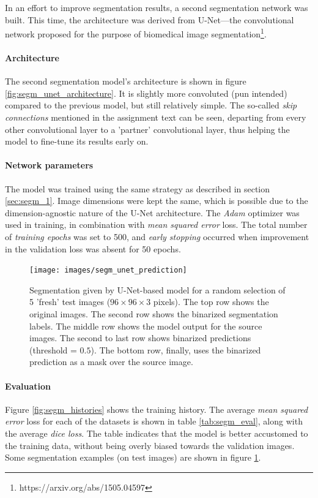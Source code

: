 In an effort to improve segmentation results, a second segmentation network was built. This time, the architecture was derived from U-Net---the convolutional network proposed for the purpose of biomedical image segmentation\footnote{https://arxiv.org/abs/1505.04597}.

\paragraph{Architecture} 
The second segmentation model's architecture is shown in figure \ref{fig:segm_unet_architecture}. It is slightly more convoluted (pun intended) compared to the previous model, but still relatively simple. The so-called \textit{skip connections} mentioned in the assignment text can be seen, departing from every other convolutional layer to a 'partner' convolutional layer, thus helping the model to fine-tune its results early on.

\paragraph{Network parameters} The model was trained using the same strategy as described in section \textcolor{blue}{\ref{sec:segm_1}}. Image dimensions were kept the same, which is possible due to the dimension-agnostic nature of the U-Net architecture. The \textit{Adam} optimizer was used in training, in combination with \textit{mean squared error} loss. The total number of \textit{training epochs} was set to 500, and \textit{early stopping} occurred when improvement in the validation loss was absent for 50 epochs.

\begin{figure}[!htbp]
  \begin{center}
    \texttt{[image: images/segm\_unet\_prediction]}
    \caption{Segmentation given by U-Net-based model for a random selection of 5 'fresh' test images ($96\times96\times3$ pixels). The top row shows the original images. The second row shows the binarized segmentation labels. The middle row shows the model output for the source images. The second to last row shows binarized predictions (threshold = $0.5$). The bottom row, finally, uses the binarized prediction as a mask over the source image.}
    \label{fig:segm_unet_prediction}
  \end{center}
\end{figure}

\paragraph{Evaluation} Figure \ref{fig:segm_histories} shows the training history. The average \textit{mean squared error} loss for each of the datasets is shown in table \textcolor{blue}{\ref{tab:segm_eval}}, along with the average \textit{dice loss}. The table indicates that the model is better accustomed to the training data, without being overly biased towards the validation images. Some segmentation examples (on test images) are shown in figure \ref{fig:segm_unet_prediction}.





